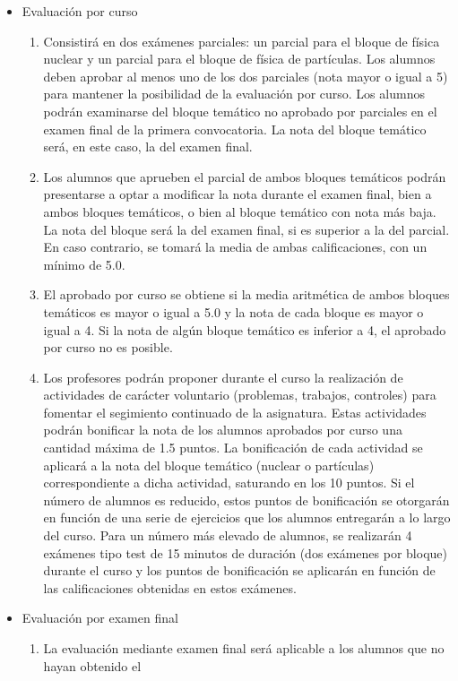\documentclass[a4paper,12pt,twoside]{article}
\begin{document}
\begin{itemize}
\item Evaluación por curso
\begin{enumerate}[label=\alph*)]
\item Consistirá en dos exámenes parciales: un parcial para el bloque de física nuclear y un parcial para el bloque de física de partículas. Los alumnos deben aprobar al menos uno de los dos
parciales (nota mayor o igual a 5) para mantener la posibilidad de la evaluación por curso. Los
alumnos podrán examinarse del bloque temático no aprobado por parciales en el examen final
de la primera convocatoria. La nota del bloque temático será, en este caso, la del examen final.
\item Los alumnos que aprueben el parcial de ambos bloques temáticos podrán presentarse a
optar a modificar la nota durante el examen final, bien a ambos bloques temáticos, o bien al
bloque temático con nota más baja. La nota del bloque será la del examen final, si es superior a la del parcial. En caso contrario, se tomará la media de ambas calificaciones, con un mínimo de
5.0.
\item El aprobado por curso se obtiene si la media aritmética de ambos bloques temáticos es mayor o igual a 5.0 y la nota de cada bloque es mayor o igual a 4. Si la nota de algún bloque temático es inferior a 4, el aprobado por curso no es posible.
\item Los profesores podrán proponer durante el curso la realización de actividades de carácter
voluntario (problemas, trabajos, controles) para fomentar el segimiento continuado de la asignatura. Estas actividades podrán bonificar la nota de los alumnos aprobados por curso una cantidad máxima de 1.5 puntos. La bonificación de cada actividad se aplicará a la nota del
bloque temático (nuclear o partículas) correspondiente a dicha actividad, saturando en los 10 puntos. Si el número de alumnos es reducido, estos puntos de bonificación se otorgarán en función de una serie de ejercicios que los alumnos entregarán a lo largo del curso. Para un número más elevado de alumnos, se realizarán 4 exámenes tipo test de 15 minutos de duración (dos exámenes por bloque) durante el curso y los puntos de bonificación se aplicarán en función de las calificaciones obtenidas en estos exámenes. 
\end{enumerate}
\item Evaluación por examen final
\begin{enumerate}[label=\alph*)]
\item La evaluación mediante examen final será aplicable a los alumnos que no hayan obtenido el

\end{enumerate}
\end{itemize}
\end{document}
